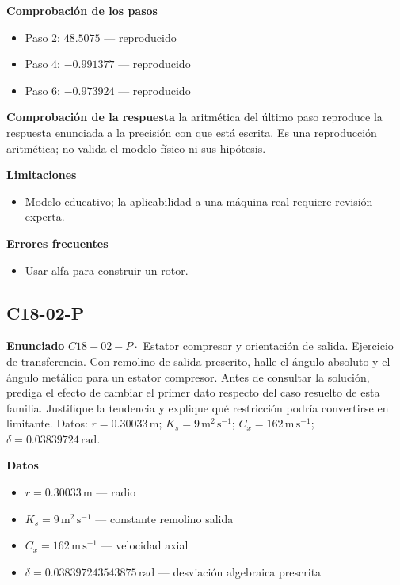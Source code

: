 \documentclass[10pt,openany]{book}
\begin{document}
\noindent\textbf{Comprobación de los pasos}
\begin{itemize}
\item Paso 2: $48.5075$ — reproducido
\item Paso 4: $-0.991377$ — reproducido
\item Paso 6: $-0.973924$ — reproducido
\end{itemize}

\noindent\textbf{Comprobación de la respuesta} la aritmética del último paso reproduce la respuesta enunciada a la precisión con que está escrita. Es una reproducción aritmética; no valida el modelo físico ni sus hipótesis.

\noindent\textbf{Limitaciones}
\begin{itemize}
\item Modelo educativo; la aplicabilidad a una máquina real requiere revisión experta.
\end{itemize}

\noindent\textbf{Errores frecuentes}
\begin{itemize}
\item Usar alfa para construir un rotor.
\end{itemize}
\subsection*{C18-02-P}

\noindent\textbf{Enunciado}
\(C18-02-P \cdot\) Estator compresor y orientación de salida. Ejercicio de transferencia. Con remolino de salida prescrito, halle el ángulo absoluto y el ángulo metálico para un estator compresor. Antes de consultar la solución, prediga el efecto de cambiar el primer dato respecto del caso resuelto de esta familia. Justifique la tendencia y explique qué restricción podría convertirse en limitante. Datos: \(r=0.30033\, \mathrm{m}\); \(K_s=9\, \mathrm{m}^{2}\,\mathrm{s}^{-1}\); \(C_x=162\, \mathrm{m}\,\mathrm{s}^{-1}\); \(\delta=0.03839724\, \mathrm{rad}\).

\noindent\textbf{Datos}
\begin{itemize}
\item $r = 0.30033\,\mathrm{m}$ — radio
\item $K_s = 9\,\mathrm{m}^{2}\,\mathrm{s}^{-1}$ — constante remolino salida
\item $C_x = 162\,\mathrm{m}\,\mathrm{s}^{-1}$ — velocidad axial
\item $\delta = 0.038397243543875\,\mathrm{rad}$ — desviación algebraica prescrita
\end{itemize}
\end{document}
